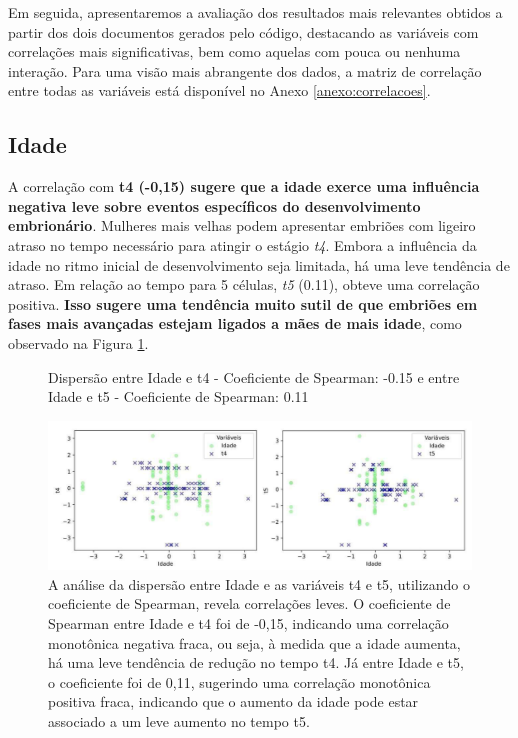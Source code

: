 Em seguida, apresentaremos a avaliação dos resultados mais relevantes obtidos a partir dos dois documentos gerados pelo código, destacando as variáveis com correlações mais significativas, bem como aquelas com pouca ou nenhuma interação. Para uma visão mais abrangente dos dados, a matriz de correlação entre todas as variáveis está disponível no Anexo \ref{anexo:correlacoes}.

\subsection*{Idade}
A correlação com \textbf{t4 (-0,15) sugere que a idade exerce uma influência negativa leve sobre eventos específicos do desenvolvimento embrionário}. Mulheres mais velhas podem apresentar embriões com ligeiro atraso no tempo necessário para atingir o estágio \textit{t4}. Embora a influência da idade no ritmo inicial de desenvolvimento seja limitada, há uma leve tendência de atraso. Em relação ao tempo para 5 células, \textit{t5} (0.11), obteve uma correlação positiva.\textbf{ Isso sugere uma tendência muito sutil de que embriões em fases mais avançadas estejam ligados a mães de mais idade}, como observado na Figura \ref{fig:idade-t4-t5}.

\begin{figure}[h]
    \captionsetup{font=footnotesize, justification=centering, labelsep=period, position=above}
    \caption{Dispersão entre Idade e t4 - Coeficiente de Spearman: -0.15 e entre Idade e t5 - Coeficiente de Spearman: 0.11}
    \label{fig:idade-t4-t5}
    \centering
    \includegraphics[scale=0.4]{figuras/Spearman/idade-t4-t5.pdf}
    \vspace{0.3cm} 
    \caption{A análise da dispersão entre Idade e as variáveis t4 e t5, utilizando o coeficiente de Spearman, revela correlações leves. O coeficiente de Spearman entre Idade e t4 foi de -0,15, indicando uma correlação monotônica negativa fraca, ou seja, à medida que a idade aumenta, há uma leve tendência de redução no tempo t4. Já entre Idade e t5, o coeficiente foi de 0,11, sugerindo uma correlação monotônica positiva fraca, indicando que o aumento da idade pode estar associado a um leve aumento no tempo t5.}
    \begin{minipage}{\linewidth}
        \centering
    \end{minipage}
\end{figure}
\FloatBarrier 

